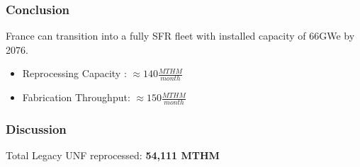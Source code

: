 \begin{frame}
	\frametitle{Conclusion}
	France can transition into
	a fully SFR fleet with installed capacity of 66GWe by 2076.
	\begin{itemize}
		\item Reprocessing Capacity : $\approx 140 \frac{MTHM}{month}$
		\item Fabrication Throughput: $\approx 150 \frac{MTHM}{month}$
	\end{itemize}
\end{frame}

\begin{frame}
    \frametitle{Discussion}
    Total Legacy \gls{UNF} reprocessed: \textbf{54,111 MTHM} 
    \begin{table}[h]
\centering
    \begin{adjustbox}{max totalsize={0.8\textwidth}{.8\textheight}, center}
                \begin{tabularx}{\textwidth}{lbb}
                    \hline 
                    

\end{tabularx}
\end{adjustbox}
\end{table}
\end{frame}
